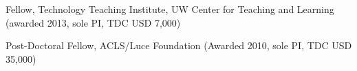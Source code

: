 
\ind Fellow, Technology Teaching Institute, UW Center for Teaching and Learning (awarded 2013, sole PI, TDC USD 7,000)

\ind Post-Doctoral Fellow, ACLS/Luce Foundation (Awarded 2010, sole PI, TDC USD 35,000)